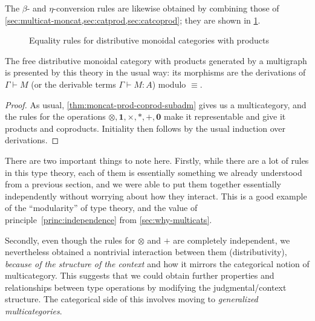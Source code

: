 \documentclass{book}
\let\types\vdash
\def\ttt{\mathord{\ast}}%
\def\pair#1#2{\langle #1,#2\rangle}
\def\inl{\mathsf{inl}}
\def\inr{\mathsf{inr}}
\def\case{\mathsf{match}_+}
\def\match{\mathsf{match}}
\def\zero{\mathbf{0}}
\def\abort{\match_{\zero}}
\def\one{\mathbf{1}}
\def\ott{\mathord{\star}}%
\let\tensor\otimes
\def\tpair#1#2{\text{\textlquill} #1,#2 \text{\textrquill}}%
\begin{document}
The $\beta$- and $\eta$-conversion rules are likewise obtained by combining those of \cref{sec:multicat-moncat,sec:catprod,sec:catcoprod}; they are shown in \cref{fig:moncat-prod-coprod-equiv}.

\begin{figure}
  \centering
  \caption{Equality rules for distributive monoidal categories with products}
  \label{fig:moncat-prod-coprod-equiv}
\end{figure}

\begin{thm}\label{thm:moncat-prod-coprod-initial}
  The free distributive monoidal category with products generated by a multigraph \cG is presented by this theory in the usual way: its morphisms are the derivations of $\Gamma\types M$ (or the derivable terms $\Gamma\types M:A$) modulo $\equiv$.
\end{thm}
\begin{proof}
  As usual, \cref{thm:moncat-prod-coprod-subadm} gives us a multicategory, and the rules for the operations $\tensor,\one,\times,\ttt,+,\zero$ make it representable and give it products and coproducts.
  Initiality then follows by the usual induction over derivations.
\end{proof}

There are two important things to note here.
Firstly, while there are a lot of rules in this type theory, each of them is essentially something we already understood from a previous section, and we were able to put them together essentially independently without worrying about how they interact.
This is a good example of the ``modularity'' of type theory, and the value of principle~\eqref{princ:independence} from \cref{sec:why-multicats}.

Secondly, even though the rules for $\tensor$ and $+$ are completely independent, we nevertheless obtained a nontrivial interaction between them (distributivity), \emph{because of the structure of the context} and how it mirrors the categorical notion of multicategory.
This suggests that we could obtain further properties and relationships between type operations by modifying the judgmental/context structure.
The categorical side of this involves moving to \emph{generalized multicategories}.
\end{document}
